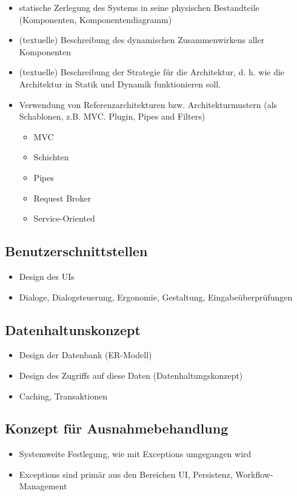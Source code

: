 \begin{itemize}
	\item  statische Zerlegung des Systems in seine physischen Bestandteile (Komponenten, Komponentendiagramm)
	\item (textuelle) Beschreibung des dynamischen Zusammenwirkens aller Komponenten 
	\item (textuelle) Beschreibung der Strategie für die Architektur, d. h. wie die Architektur in Statik und Dynamik funktionieren soll.
	\item Verwendung von Referenzarchitekturen bzw. Architekturmustern (als Schablonen, z.B. MVC. Plugin, Pipes and Filters)
	\begin{itemize}
		\item MVC
		\item Schichten
		\item Pipes
		\item Request Broker
		\item Service-Oriented
	\end{itemize}
\end{itemize}

\subsection{Benutzerschnittstellen} 
\begin{itemize}
	\item Design des UIs
	\item Dialoge, Dialogsteuerung, Ergonomie, Gestaltung, Eingabeüberprüfungen
\end{itemize}

\subsection{Datenhaltunskonzept}
\begin{itemize}
	\item Design der Datenbank (ER-Modell)
	\item Design des Zugriffs auf diese Daten (Datenhaltungskonzept)
	\item Caching, Transaktionen
\end{itemize}

\subsection{Konzept für Ausnahmebehandlung}
\begin{itemize}
	\item Systemweite Festlegung, wie mit Exceptions umgegangen wird
	\item Exceptions sind primär aus den Bereichen UI, Persistenz, Workflow-Management
\end{itemize}

